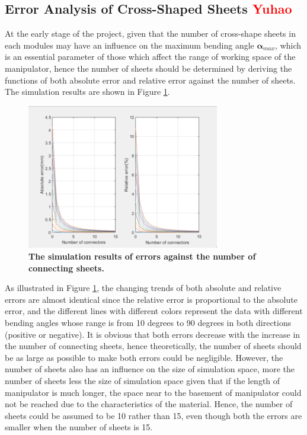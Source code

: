 \subsection{Error Analysis of Cross-Shaped Sheets \textcolor{red}{Yuhao}}
At the early stage of the project, given that the number of cross-shape sheets in each modules may have an 
influence on the maximum bending angle $\boldsymbol{\alpha}_{max}$, which is an essential parameter of those which 
affect the range of working space of the manipulator, hence the number of sheets should be determined by deriving 
the functions of both absolute error and relative error \cite{fishboneCR} against the number of sheets. The 
simulation results are shown in Figure \ref{fig:error_analysis}.
\begin{figure}[H] %
    \centering 
    \captionsetup{labelsep=colon}
    \includegraphics[width=0.75\textwidth]{Image/Result/error_analysis.png} 
    \caption[The simulation results of errors against the number of connecting sheets]
    {\centering \textbf{The simulation results of errors against the number of connecting sheets.}}
    \label{fig:error_analysis}
\end{figure}
As illustrated in Figure \ref{fig:error_analysis}, the changing trends of both absolute and relative errors are 
almost identical since 
the relative error is proportional to the absolute error, and the different lines with different colors represent 
the data with different bending angles whose range is from 10 degrees to 90 degrees in both directions (positive 
or negative). It is obvious that both errors decrease with the increase in the number of connecting sheets, hence 
theoretically, the number of sheets should be as large as possible to make both errors could be negligible. However, 
the number of sheets also has an influence on the size of simulation space, more the number of sheets less the size 
of simulation space given that if the length of manipulator is much longer, the space near to the basement of 
manipulator could not be reached due to the characteristics of the material. Hence, the number of sheets could be 
assumed to be 10 rather than 15, even though both the errors are smaller when the number of sheets is 15. \\
